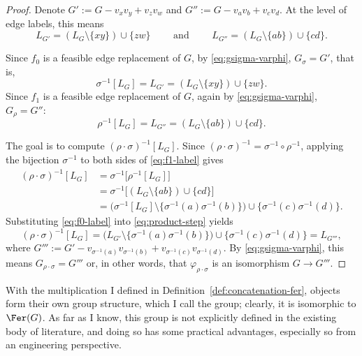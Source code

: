 \begin{proof}
    Denote $G':=G-v_xv_y+v_zv_w$ and $G'':=G-v_av_b+v_cv_d$.
    At the level of edge labels, this means
    $$
        L_{G'}=(L_G\setminus\{xy\})\cup\{zw\}\qquad\text{ and }\qquad L_{G''}=(L_G\setminus\{ab\})\cup\{cd\}.
    $$

    Since $f_0$ is a feasible edge replacement of $G$, by \eqref{eq:gsigma-varphi}, $G_\sigma=G'$, that is,
    \begin{equation}\label{eq:f0-label}
        \sigma^{-1}[L_G]=L_{G'}=(L_G\setminus\{xy\})\cup\{zw\}.
    \end{equation}
    Since $f_1$ is a feasible edge replacement of $G$, again by \eqref{eq:gsigma-varphi}, $G_\rho=G''$:
    \begin{equation}\label{eq:f1-label}
        \rho^{-1}[L_G]=L_{G''}=(L_G\setminus\{ab\})\cup\{cd\}.
    \end{equation}
    
    The goal is to compute $(\rho\cdot\sigma)^{-1}[L_G]$.
    Since $(\rho\cdot\sigma)^{-1}=\sigma^{-1}\circ\rho^{-1}$, applying the bijection $\sigma^{-1}$ to both sides of \eqref{eq:f1-label} gives
    \begin{align}
        (\rho\cdot\sigma)^{-1}[L_G]
        &= \sigma^{-1}\bigl[\rho^{-1}[L_G]\bigr] \nonumber\\
        &= \sigma^{-1}\bigl[(L_G\setminus\{ab\})\cup\{cd\}\bigr] \nonumber\\
        &= \bigl(\sigma^{-1}[L_G]\setminus\{\sigma^{-1}(a)\sigma^{-1}(b)\}\bigr)\cup\{\sigma^{-1}(c)\sigma^{-1}(d)\}.
        \label{eq:product-step}
    \end{align}
    Substituting \eqref{eq:f0-label} into \eqref{eq:product-step} yields
    $$
        (\rho\cdot\sigma)^{-1}[L_G]= \bigl(L_{G'}\setminus\{\sigma^{-1}(a)\sigma^{-1}(b)\}\bigr)\cup\{\sigma^{-1}(c)\sigma^{-1}(d)\} = L_{G'''},
    $$
    where $G''':=G'-v_{\sigma^{-1}(a)}v_{\sigma^{-1}(b)}+v_{\sigma^{-1}(c)}v_{\sigma^{-1}(d)}$.
    By \eqref{eq:gsigma-varphi}, this means $G_{\rho\cdot\sigma}=G'''$ or, in other words, that $\varphi_{\rho\cdot\sigma}$ is an isomorphism $G\to G'''$.
\end{proof}

With the multiplication I defined in Definition~\ref{def:concatenation-fer}, \tfer objects form their own group structure, which I call the \tFer group; clearly, it is isomorphic to $\Fer(G)$.
As far as I know, this group is not explicitly defined in the existing body of literature, and doing so has some practical advantages, especially so from an engineering perspective.

